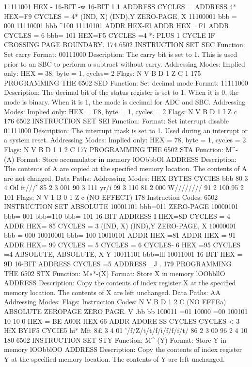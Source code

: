 11111001
HEX -
16-BIT
-w
16-BIT
1
1
ADDRESS
CYCLES =
ADDRESS
4*
HEX=F9 CYCLES = 4*
(IND, X)
(IND),Y
ZERO-PAGE, X
11100001
bbb = 000
11110001
bbb ^100
11110101
ADDR
HEX-El
ADDR
HEX= F1
ADDR
CYCLES = 6
bbb= 101 HEX=F5 CYCLES =4
*: PLUS 1 CYCLE IF CROSSING PAGE BOUNDARY.
174
6502 INSTRUCTION SET
SEC
Function:
Set carry
Format: 00111000
Description:
The carry bit is set to 1. This is used prior to an SBC to perform
a subtract without carry.
Addressing Modes:
Implied only:
HEX = 38, byte = 1, cycles= 2
Flags: N V B D 1 Z C
1
175
PROGRAMMING THE 6502
SED
Function:
Set decimal mode
Format:
11111000
Description:
The decimal bit of the status register is set to 1. When it is 0,
the mode is binary. When it is 1, the mode is decimal for ADC and
SBC.
Addressing Modes:
Implied only:
HEX = F8, byte = 1, cycles = 2
Flags: N V B D
1
I Z c
176
6502 INSTRUCTION SET
SEI
Function:
Format:
Set interrupt disable
01111000
Description:
The interrupt mask is set to 1. Used during an interrupt or a system
reset.
Addressing Modes:
Implied only:
HEX = 78, byte = 1, cycles = 2
Flags: N V B D 1
1
2 C
177
PROGRAMMING THE 6502
STA
Function:
M^-(A)
Format:
Store accumulator in memory
lOObbbOl ADDRESS
Description:
The contents of A are copied at the specified memory location.
The contents of A are not changed.
Data Paths:
Addressing Modes:
HEX
BYTES
CYCIES
bbb
80
3
4
Oil
ft///'
85
2
3
001
90
3
111
yr/i
99
3
110
81
2
000
W////////
91
2
100
95
2
101
Flags:
N V
1
B 0 1 Z c
(NO EFFECT)
178
Instruction Codes:
6502 INSTRUCTION SET
ABSOLUTE 10001101
bbb=011
ZERO-PAGE 10000101
bbb= 001
bbb=110
bbb= 101
16-BIT ADDRESS
I
HEX=8D CYCLES = 4
ADDR
HEX= 85 CYCLES = 3
(IND, X)
(IND),Y
ZERO-PAGE, X
10000001
bbb = 000
10010001
bbb= 100
10010101
ADDR
HEX =81
ADDR
HEX = 91
ADDR
HEX= 99 CYCLES = 5
CYCLES = 6
CYCLES- 6
HEX =95 CYCLES =4
ABSOLUTE,
ABSOLUTE,
X
Y
10011101
bbb=lll
10011001
16-BIT
HEX = 9D
16-BIT
ADDRESS
CYCLES =5
ADDRESS
_J .
179
PROGRAMMING THE 6502
STX
Function:
M«*-(X)
Format:
Store X in memory
lOObbllO ADDRESS
Description:
Copy the contents of index register X at the specified memory
location. The contents of X are left unchanged.
Data Paths:
AA
Addressing Modes:
Flags:
Instruction Codes:
N V B D 1 2 C
(NO EFFEa)
ABSOLUTE
ZEROPAGE
ZERO PAGE. V
.bb
bb
100011
=01
10000
=00
100101
10
10
0
HEX = BE
A00R
HEX-66
ADDR
ADORE SS
CYCLES
CYCLES
<
3
HfX
BY1F5
CYCIE5
hi*
Mft
8£
3
4
01
'/f/Z/t/t/f/i/f/f/f/t/
86
2
3
00
96
2
4
10
180
6502 INSTRUCTION SET
STY
Function:
M^-(Y)
Format:
Store Y in memory
lOObblOO ADDRESS
Description:
Copy the contents of index register Y at the specified memory
location. The contents of Y are left unchanged.
